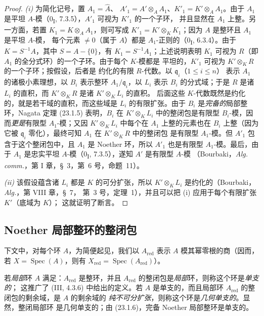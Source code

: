 \begin{proof}
\emph{(i)} 为简化记号，置 $A_1=\widehat A$、
$A'_1=A'\otimes_AA_1$、$K'_1=K'\otimes_AA_1$。由于 $A_1$ 是平坦
$A$-模（0\textsubscript{I}, 7.3.5），$A'_1$ 可视为 $K'_1$ 的一个子环，
并且显然在 $A_1$ 上整。另一方面，若置 $K_1=K\otimes_AA_1$，则可写成
$K'_1=K'\otimes_KK_1$；因为 $A$ 是整环且 $A_1$ 是平坦 $A$-模，
每个元素 $\neq0$（属于 $A$）都是 $A_1$-正则的（0\textsubscript{I}, 6.3.4）。由于
$K=S^{-1}A$，其中 $S=A-\{0\}$，有 $K_1=S^{-1}A_1$；上述说明表明
$K_1$ 可视为 $R$（即 $A_1$ 的全分式环）的一个子环。由于每个 $K$-模都是
平坦的，$K'_1$ 可视为 $K'\otimes_KR$ 的一个子环；按假设，后者是
约化的有限 $R$-代数。以 $\mathfrak q_i$（$1\leqslant i\leqslant n$）
表示 $A_1$ 的诸极小素理想，以 $B_i$ 表示整环
$A_1/\mathfrak q_i$，以 $L_i$ 表示 $B_i$ 的分式域；于是 $R$ 是诸
$L_i$ 的直积，而 $K'\otimes_KR$ 是诸 $K'\otimes_KL_i$ 的直积。
后面这些 $K$-代数既然是约化的，就是若干域的直积，而这些域是 $L_i$
的有限扩张。由于 $B_i$ 是\emph{完备的}局部整环，Nagata 定理
(23.1.5) 表明，$B_i$ 在 $K'\otimes_KL_i$ 中的整闭包是有限型
$B_i$-模，因而\emph{更是}有限型 $A_1$-模；又因
$K'\otimes_KL_i$ 中每个在 $A_1$ 上整的元素也在 $B_i$ 上整（因为它被
$\mathfrak q_i$ 零化），最终可知 $A_1$ 在 $K'\otimes_KR$ 中的整闭包
是有限型 $A_1$-模。但 $A'_1$ 包含于这个整闭包中，且 $A_1$ 是 Noether
环，所以 $A'_1$ 也是有限型 $A_1$-模。最后，由于 $A_1$ 是忠实平坦
$A$-模（0\textsubscript{I}, 7.3.5），遂知 $A'$ 是有限型 $A$-模
（Bourbaki，\emph{Alg. comm.}，第 I 章，§~3，第~6 号，命题~11）。


\emph{(ii)} 该假设蕴含诸 $L_i$ 都是 $K$ 的可分扩张，所以
$K'\otimes_KL_i$ 是约化的（Bourbaki，\emph{Alg.}，第 VIII 章，§~7，
第~3 号，定理~1），并且可以把 (i) 应用于每个有限扩张 $K'$（底域为 $K$）；
这就证明了断言。
\end{proof}

\subsection{Noether 局部整环的整闭包}
\label{subsection:0.23.2-fr}

\begin{env}[23.2.1]
\label{0.23.2.1-fr}
下文中，对每个环 $A$，为简便起见，我们以 $A_{\mathrm{red}}$ 表示 $A$
模其幂零根的商（因而，若 $X=\operatorname{Spec}(A)$，则有
$X_{\mathrm{red}}=\operatorname{Spec}(A_{\mathrm{red}})$）。

若\emph{局部}环 $A$ 满足：$A_{\mathrm{red}}$ 是整环，并且
$A_{\mathrm{red}}$ 的整闭包是\emph{局部}环，则称这个环是\emph{单支的}；
这推广了 (III, 4.3.6) 中给出的定义。若 $A$ 是单支的，而且局部环
$A_{\mathrm{red}}$ 的整闭包的剩余域，是 $A$ 的剩余域的
\emph{纯不可分扩张}，则称这个环是\emph{几何单支的}。显然，整闭局部环
是几何单支的；由 (23.1.6)，完备 Noether 局部整环是单支的。
\end{env}

